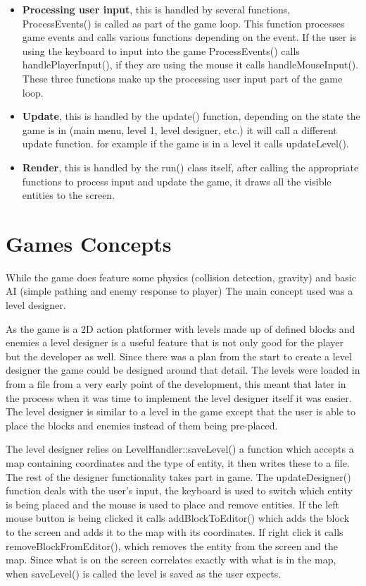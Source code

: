 \documentclass{article}
\begin{document}
\begin{itemize}
\item \textbf{Processing user input}, this is handled by several functions, ProcessEvents() is called as part of the game loop.
This function processes game events and calls various functions depending on the event. 
If the user is using the keyboard to input into the game ProcessEvents() calls handlePlayerInput(), if they are using the mouse it calls handleMouseInput().
These three functions make up the processing user input part of the game loop.

\item \textbf{Update}, this is handled by the update() function, depending on the state the game is in (main menu, level 1, level designer, etc.) it will call a different update function.
for example if the game is in a level it calls updateLevel().

\item \textbf{Render}, this is handled by the run() class itself, after calling the appropriate functions to process input and update the game, it draws all the visible entities to the screen.
\end{itemize}


\section{Games Concepts}

While the game does feature some physics (collision detection, gravity) and basic AI (simple pathing and enemy response to player) The main concept used was a level designer.

As the game is a 2D action platformer with levels made up of defined blocks and enemies a level designer is a useful feature that is not only good for the player but the developer as well.
Since there was a plan from the start to create a level designer the game could be designed around that detail.
The levels were loaded in from a file from a very early point of the development,
this meant that later in the process when it was time to implement the level designer itself it was easier.
The level designer is similar to a level in the game except that the user is able to place the blocks and enemies instead of them being pre-placed.

The level designer relies on LevelHandler::saveLevel() a function which accepts a map containing coordinates and the type of entity, it then writes these to a file.
The rest of the designer functionality takes part in game.
The updateDesigner() function deals with the user's input, the keyboard is used to switch which entity is being placed and the mouse is used to place and remove entities.
If the left mouse button is being clicked it calls addBlockToEditor() which adds the block to the screen and adds it to the map with its coordinates.
If right click it calls removeBlockFromEditor(), which removes the entity from the screen and the map.
Since what is on the screen correlates exactly with what is in the map, when saveLevel() is called the level is saved as the user expects.
\end{document}
